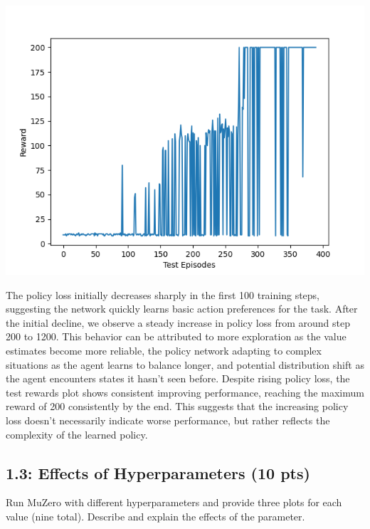 \documentclass[12pt]{article}
\begin{document}
\begin{tcolorbox}[height=45em, width=\textwidth]
\begin{center}
    \begin{minipage}{0.45\textwidth}
        \includegraphics[width=\textwidth]{outputs/plots/sim_50/testing/test_rewards.png}
    \end{minipage}

    The policy loss initially decreases sharply in the first 100 training steps, suggesting the network quickly learns basic action preferences for the task. After the initial decline, we observe a steady increase in policy loss from around step 200 to 1200. This behavior can be attributed to more exploration as the value estimates become more reliable, the policy network adapting to complex situations as the agent learns to balance longer, and potential distribution shift as the agent encounters states it hasn't seen before. Despite rising policy loss, the test rewards plot shows consistent improving performance, reaching the maximum reward of 200 consistently by the end. This suggests that the increasing policy loss doesn't necessarily indicate worse performance, but rather reflects the complexity of the learned policy.
\end{center}
\end{tcolorbox}
\newpage


\subsection*{1.3: Effects of Hyperparameters (10 pts)}
Run MuZero with different hyperparameters and provide three plots for each value (nine total). Describe and explain the effects of the parameter.
\end{document}
